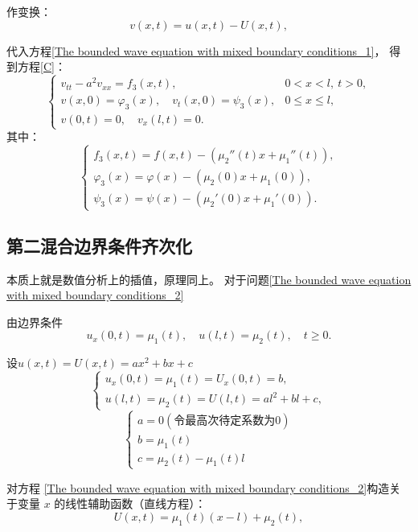\documentclass[12pt,a4paper]{article}
\numberwithin{subsection}{section}
\numberwithin{subsubsection}{subsection}
\theoremstyle{plain}
\theoremstyle{definition}
\theoremstyle{remark}
\begin{document}
	作变换：
	\begin{equation}
		v(x, t) = u(x, t) - U(x, t),
	\end{equation}
	
	代入方程\eqref{The bounded wave equation with mixed boundary conditions_1}，
	得到方程\eqref{C}：
	\begin{equation}\label{C}
		\begin{cases}
			v_{tt} - a^2 v_{xx} = f_3(x, t), & 0 < x < l, \ t > 0, \\
			v(x, 0) = \varphi_3(x), \quad v_t(x, 0) = \psi_3(x), & 0 \leq x \leq l, \\
			v(0, t) = 0, \quad v_x(l, t) = 0. &
		\end{cases}
	\end{equation}
	其中：
\begin{equation}
	\begin{cases}
		f_3(x, t) = f(x, t) - (\mu_2''(t)x + \mu_1''(t)), \\
		\varphi_3(x) = \varphi(x) - (\mu_2(0)x + \mu_1(0)), \\
		\psi_3(x) = \psi(x) - (\mu_2'(0)x + \mu_1'(0)).
	\end{cases}
\end{equation}
	
	
		\subsection{第二混合边界条件齐次化}
	本质上就是数值分析上的插值，原理同上。
	对于问题\eqref{The bounded wave equation with mixed boundary conditions_2}
	
	由边界条件
	\begin{equation}
		u_x(0,t) = \mu_1(t), \quad u(l,t) = \mu_2(t), \quad t \geq 0.
	\end{equation}
	
	设$u(x, t)=U(x, t)=ax^2+bx+c$
	\[
	\begin{cases}
		u_x(0, t) = \mu_1(t) = U_x(0, t) = b, \\
		u(l, t) = \mu_2(t) = U(l, t) = al^2 + bl+c,
	\end{cases}
	\]
	\[
	\begin{cases}
		a = 0 (\text{令最高次待定系数为0})\\
	b =\mu_1(t) \\
	c = \mu_2(t)-\mu_1(t)l
	\end{cases}
	\]
	
	对方程 \eqref{The bounded wave equation with mixed boundary conditions_2}构造关于变量 \(x\) 的线性辅助函数（直线方程）：
	\begin{equation}
		U(x, t) = \mu_1(t)(x-l) + \mu_2(t) ,
	\end{equation}
	
\end{document}
